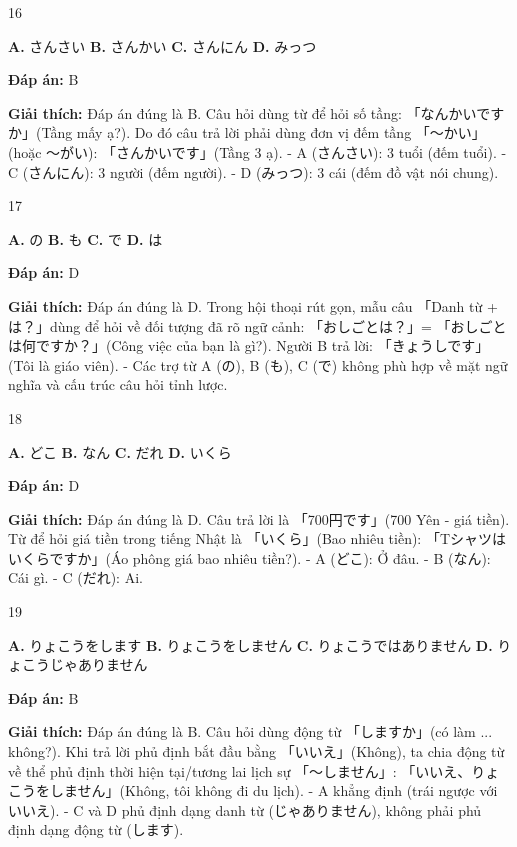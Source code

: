 \documentclass[12pt,a4paper]{report}
\newcommand{\source}[1]{}
\newcommand{\choice}[2]{\textbf{#1.} #2 \quad}
\newcommand{\answer}[1]{\par\textbf{Đáp án:} #1}
\newcommand{\confidence}[1]{}
\newcommand{\explain}[1]{\par\textbf{Giải thích:} #1\vspace{0.5cm}}
\begin{document}
\begin{question}{16}
\source{18.webp}
\choice{A}{さんさい}
\choice{B}{さんかい}
\choice{C}{さんにん}
\choice{D}{みっつ}
\answer{B}
\confidence{high}
\explain{Đáp án đúng là B. Câu hỏi dùng từ để hỏi số tầng: 「なんかいですか」(Tầng mấy ạ?). Do đó câu trả lời phải dùng đơn vị đếm tầng 「〜かい」(hoặc 〜がい): 「さんかいです」(Tầng 3 ạ).
- A (さんさい): 3 tuổi (đếm tuổi).
- C (さんにん): 3 người (đếm người).
- D (みっつ): 3 cái (đếm đồ vật nói chung).}
\end{question}

\begin{question}{17}
\source{20.webp}
\choice{A}{の}
\choice{B}{も}
\choice{C}{で}
\choice{D}{は}
\answer{D}
\confidence{high}
\explain{Đáp án đúng là D. Trong hội thoại rút gọn, mẫu câu 「Danh từ + は？」dùng để hỏi về đối tượng đã rõ ngữ cảnh: 「おしごとは？」= 「おしごとは何ですか？」(Công việc của bạn là gì?). Người B trả lời: 「きょうしです」(Tôi là giáo viên).
- Các trợ từ A (の), B (も), C (で) không phù hợp về mặt ngữ nghĩa và cấu trúc câu hỏi tỉnh lược.}
\end{question}

\begin{question}{18}
\source{21.webp}
\choice{A}{どこ}
\choice{B}{なん}
\choice{C}{だれ}
\choice{D}{いくら}
\answer{D}
\confidence{high}
\explain{Đáp án đúng là D. Câu trả lời là 「700円です」(700 Yên - giá tiền). Từ để hỏi giá tiền trong tiếng Nhật là 「いくら」(Bao nhiêu tiền): 「Tシャツはいくらですか」(Áo phông giá bao nhiêu tiền?).
- A (どこ): Ở đâu.
- B (なん): Cái gì.
- C (だれ): Ai.}
\end{question}

\begin{question}{19}
\source{22.webp}
\choice{A}{りょこうをします}
\choice{B}{りょこうをしません}
\choice{C}{りょこうではありません}
\choice{D}{りょこうじゃありません}
\answer{B}
\confidence{high}
\explain{Đáp án đúng là B. Câu hỏi dùng động từ 「しますか」(có làm ... không?). Khi trả lời phủ định bắt đầu bằng 「いいえ」(Không), ta chia động từ về thể phủ định thời hiện tại/tương lai lịch sự 「〜しません」: 「いいえ、りょこうをしません」(Không, tôi không đi du lịch).
- A khẳng định (trái ngược với いいえ).
- C và D phủ định dạng danh từ (じゃありません), không phải phủ định dạng động từ (します).}
\end{question}
\end{document}
